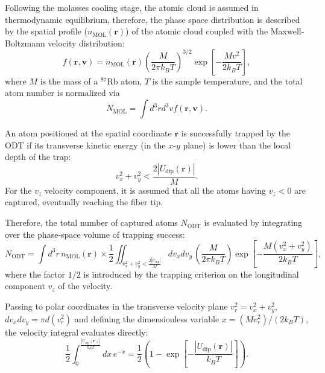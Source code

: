 Following the molasses cooling stage, the atomic cloud is assumed in thermodynamic equilibrium, therefore, the phase space distribution is described by the spatial profile ($n_\text{MOL}(\mathbf{r})$) of the atomic cloud coupled with the Maxwell-Boltzmann velocity distribution:
\begin{equation}
    f(\mathbf{r}, \mathbf{v}) = n_{\text{MOL}}(\mathbf{r}) \left( \frac{M}{2\pi k_B T} \right)^{3/2} \exp\left[ -\frac{M v^2}{2k_B T} \right],
\end{equation}
where $M$ is the mass of a $^{87}$Rb atom, $T$ is the sample temperature, and the total atom number
is normalized via 
\begin{equation}
    N_{\text{MOL}} = \int d^3r d^3v f(\mathbf{r}, \mathbf{v}).
\end{equation}

An atom positioned at the spatial coordinate $\mathbf{r}$ is successfully trapped by the ODT if its transverse kinetic energy (in the $x$-$y$ plane) is lower than the local depth of the trap:
\begin{equation}
    v_x^2 + v_y^2 < \frac{2|U_{\text{dip}}(\mathbf{r})|}{M}.
\end{equation}
For the $v_z$ velocity component, it is assumed that all the atoms having $v_z < 0$ are captured, eventually reaching the fiber tip.

Therefore, the total number of captured atoms $N_{\text{ODT}}$ is evaluated by integrating over the phase-space volume of trapping success:
\begin{equation}
    N_{\text{ODT}} = \int d^3r \, n_{\text{MOL}}(\mathbf{r}) \times \frac{1}{2} \iint_{v_x^2+v_y^2 < \frac{2|U_{\text{dip}}|}{M}} dv_x dv_y \, \left( \frac{M}{2\pi k_B T} \right) \exp\left[ -\frac{M(v_x^2 + v_y^2)}{2k_B T} \right],
\end{equation}
where the factor $1/2$ is introduced by the trapping criterion on the longitudinal component $v_z$ of the velocity.

Passing to polar coordinates in the transverse velocity plane $v_r^2 = v_x^2 + v_y^2$, $dv_x dv_y = \pi d(v_r^2)$ and defining the dimensionless variable $x = (M v_r^2)/(2k_B T)$, the velocity integral evaluates directly:
\begin{equation}
    \frac{1}{2} \int_{0}^{\frac{|U_{\text{dip}}(\mathbf{r})|}{k_B T}} dx \, e^{-x} = \frac{1}{2} \left( 1 - \exp\left[ -\frac{|U_{\text{dip}}(\mathbf{r})|}{k_B T} \right] \right).
\end{equation}

